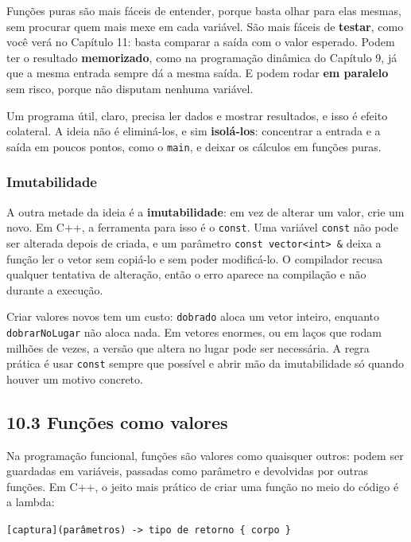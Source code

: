 Funções puras são mais fáceis de entender, porque basta olhar para elas mesmas, sem procurar quem mais mexe em cada variável. São mais fáceis de \textbf{testar}, como você verá no Capítulo 11: basta comparar a saída com o valor esperado. Podem ter o resultado \textbf{memorizado}, como na programação dinâmica do Capítulo 9, já que a mesma entrada sempre dá a mesma saída. E podem rodar \textbf{em paralelo} sem risco, porque não disputam nenhuma variável.

Um programa útil, claro, precisa ler dados e mostrar resultados, e isso é efeito colateral. A ideia não é eliminá-los, e sim \textbf{isolá-los}: concentrar a entrada e a saída em poucos pontos, como o \texttt{main}, e deixar os cálculos em funções puras.

\subsubsection{Imutabilidade}

A outra metade da ideia é a \textbf{imutabilidade}: em vez de alterar um valor, crie um novo. Em C++, a ferramenta para isso é o \texttt{const}. Uma variável \texttt{const} não pode ser alterada depois de criada, e um parâmetro \texttt{const vector<int> \&} deixa a função ler o vetor sem copiá-lo e sem poder modificá-lo. O compilador recusa qualquer tentativa de alteração, então o erro aparece na compilação e não durante a execução.

Criar valores novos tem um custo: \texttt{dobrado} aloca um vetor inteiro, enquanto \texttt{dobrarNoLugar} não aloca nada. Em vetores enormes, ou em laços que rodam milhões de vezes, a versão que altera no lugar pode ser necessária. A regra prática é usar \texttt{const} sempre que possível e abrir mão da imutabilidade só quando houver um motivo concreto.

\subsection{10.3 Funções como valores}

Na programação funcional, funções são valores como quaisquer outros: podem ser guardadas em variáveis, passadas como parâmetro e devolvidas por outras funções. Em C++, o jeito mais prático de criar uma função no meio do código é a lambda:

\begin{center}
\texttt{[captura](parâmetros) -> tipo de retorno \{ corpo \}}
\end{center}

